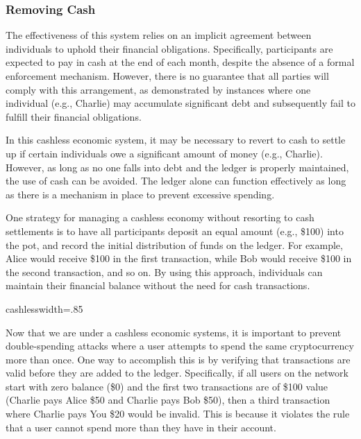 \subsubsection{Removing Cash}
The effectiveness of this system relies on an implicit agreement between individuals to uphold their financial obligations. Specifically,
participants are expected to pay in cash at the end of each month, despite the absence of a formal enforcement mechanism. However, there
is no guarantee that all parties will comply with this arrangement, as demonstrated by instances where one individual (e.g., Charlie)
may accumulate significant debt and subsequently fail to fulfill their financial obligations.

In this cashless economic system, it may be necessary to revert to cash to settle up if certain individuals owe a significant amount of
money (e.g., Charlie). However, as long as no one falls into debt and the ledger is properly maintained, the use of cash can be avoided.
The ledger alone can function effectively as long as there is a mechanism in place to prevent excessive spending.

One strategy for managing a cashless economy without resorting to cash settlements is to have all participants deposit an equal amount
(e.g., \$100) into the pot, and record the initial distribution of funds on the ledger. For example, Alice would receive \$100 in the
first transaction, while Bob would receive \$100 in the second transaction, and so on. By using this approach, individuals can maintain
their financial balance without the need for cash transactions.

{cashless}{width=.85\textwidth}%

Now that we are under a cashless economic systems, it is important to prevent double-spending attacks where a user attempts to spend
the same cryptocurrency more than once. One way to accomplish this is by verifying that transactions are valid before they are added
to the ledger. Specifically, if all users on the network start with zero balance (\$0) and the first two transactions are of \$100
value (Charlie pays Alice \$50 and Charlie pays Bob \$50), then a third transaction where Charlie pays You \$20 would be invalid.
This is because it violates the rule that a user cannot spend more than they have in their account.

%

